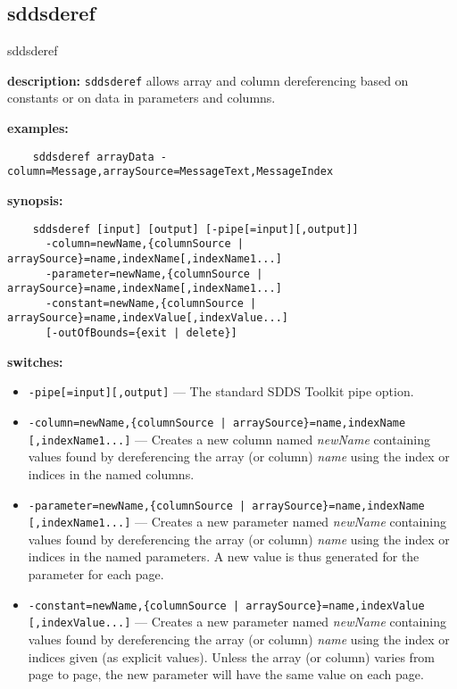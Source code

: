 \newpage

\subsection{sddsderef}
\label{sddsderef}

\begin{sddsprog}{sddsderef}
  \item \textbf{description:} \verb|sddsderef| allows array and column dereferencing based on constants or on data in parameters and columns.
  \item \textbf{examples:}
    \begin{verbatim}
    sddsderef arrayData -column=Message,arraySource=MessageText,MessageIndex
    \end{verbatim}
  \item \textbf{synopsis:}
    \begin{verbatim}
    sddsderef [input] [output] [-pipe[=input][,output]]
      -column=newName,{columnSource | arraySource}=name,indexName[,indexName1...]
      -parameter=newName,{columnSource | arraySource}=name,indexName[,indexName1...]
      -constant=newName,{columnSource | arraySource}=name,indexValue[,indexValue...]
      [-outOfBounds={exit | delete}]
    \end{verbatim}
  \item \textbf{switches:}
    \begin{itemize}
      \item \verb|-pipe[=input][,output]| --- The standard SDDS Toolkit pipe option.
      \item \verb!-column=newName,{columnSource | arraySource}=name,indexName! \verb|[,indexName1...]| --- Creates a new column named \emph{newName} containing values found by dereferencing the array (or column) \emph{name} using the index or indices in the named columns.
      \item \verb!-parameter=newName,{columnSource | arraySource}=name,indexName! \verb|[,indexName1...]| --- Creates a new parameter named \emph{newName} containing values found by dereferencing the array (or column) \emph{name} using the index or indices in the named parameters. A new value is thus generated for the parameter for each page.
      \item \verb!-constant=newName,{columnSource | arraySource}=name,indexValue! \verb|[,indexValue...]| --- Creates a new parameter named \emph{newName} containing values found by dereferencing the array (or column) \emph{name} using the index or indices given (as explicit values). Unless the array (or column) varies from page to page, the new parameter will have the same value on each page.

\end{itemize}
\end{sddsprog}
